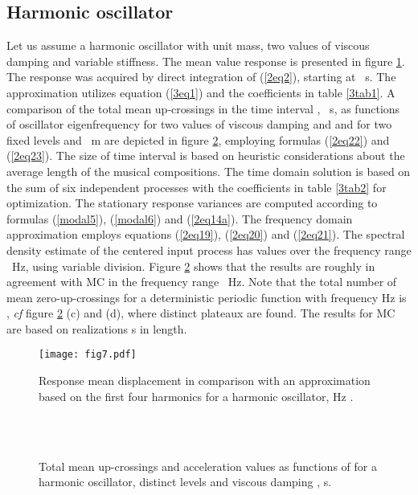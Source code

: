\documentclass[preprint,12pt,authoryear]{elsarticle}
\begin{document}
\subsection{Harmonic oscillator}
\label{harmosc}
Let us assume a harmonic oscillator with unit mass, two values of viscous damping  and variable stiffness. The mean value response is presented in figure \ref{4fig2}. The response was acquired by direct integration of (\ref{2eq2}), starting at ~s. The approximation utilizes equation (\ref{3eq1}) and the coefficients in table \ref{3tab1}. A comparison of the total mean up-crossings  in the time interval , ~s, as functions of oscillator eigenfrequency  for two values of viscous damping  and  and for two fixed levels  and ~m are depicted in figure \ref{4fig3}, employing formulas (\ref{2eq22}) and (\ref{2eq23}). The size of time interval  is based on heuristic considerations about the average length of the musical compositions. The time domain solution is based on the sum of six independent  processes with the coefficients in table \ref{3tab2} for  optimization. The stationary response variances are computed according to formulas (\ref{modal5}), (\ref{modal6}) and (\ref{2eq14a}). The frequency domain approximation employs equations (\ref{2eq19}), (\ref{2eq20}) and (\ref{2eq21}). The spectral density estimate  of the centered input process has  values over the frequency range ~Hz, using variable division. Figure \ref{4fig3} shows that the results are roughly in agreement with MC in the frequency range ~Hz. Note that the total number of mean zero-up-crossings for a deterministic periodic function with frequency  Hz is , \textit{cf} figure \ref{4fig3} (c) and (d), where distinct plateaux are found. The results for MC are based on  realizations  s in length.
\begin{figure}
	\centering
	\texttt{[image: fig7.pdf]}
	\caption{Response mean displacement in comparison with an approximation based on the first four harmonics for a harmonic oscillator,  Hz .}
	\label{4fig2}
\end{figure}
\begin{figure}
	\centering
{}
\\
\\
	\caption{Total mean up-crossings  and acceleration  values as functions of  for a harmonic oscillator, distinct levels  and viscous damping ,  s.}
	\label{4fig3}
\end{figure}
\end{document}
